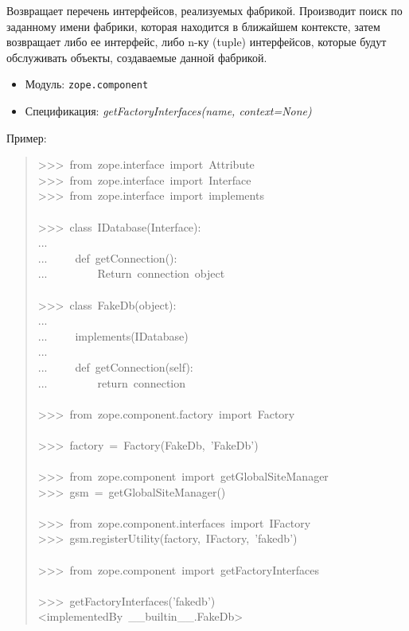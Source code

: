 \documentclass[a4paper,openany,twoside,final]{book}
\providecommand*{\DUroletitlereference}[1]{\textsl{#1}}
\begin{document}
Возвращает перечень интерфейсов, реализуемых фабрикой.  Производит
поиск по заданному имени фабрики, которая находится в ближайшем
контексте, затем возвращает либо ее интерфейс, либо n-ку (tuple)
интерфейсов, которые будут обслуживать объекты, создаваемые данной
фабрикой.

\begin{itemize}

\item Модуль: \texttt{zope.component}

\item Спецификация: \DUroletitlereference{getFactoryInterfaces(name, context=None)}

\end{itemize}

Пример:

\begin{quote}{\ttfamily \raggedright \noindent
>{}>{}>~from~zope.interface~import~Attribute\\
>{}>{}>~from~zope.interface~import~Interface\\
>{}>{}>~from~zope.interface~import~implements\\
~\\
>{}>{}>~class~IDatabase(Interface):\\
...\\
...~~~~~def~getConnection():\\
...~~~~~~~~~\textquotedbl{}\textquotedbl{}\textquotedbl{}Return~connection~object\textquotedbl{}\textquotedbl{}\textquotedbl{}\\
~\\
>{}>{}>~class~FakeDb(object):\\
...\\
...~~~~~implements(IDatabase)\\
...\\
...~~~~~def~getConnection(self):\\
...~~~~~~~~~return~\textquotedbl{}connection\textquotedbl{}\\
~\\
>{}>{}>~from~zope.component.factory~import~Factory\\
~\\
>{}>{}>~factory~=~Factory(FakeDb,~'FakeDb')\\
~\\
>{}>{}>~from~zope.component~import~getGlobalSiteManager\\
>{}>{}>~gsm~=~getGlobalSiteManager()\\
~\\
>{}>{}>~from~zope.component.interfaces~import~IFactory\\
>{}>{}>~gsm.registerUtility(factory,~IFactory,~'fakedb')\\
~\\
>{}>{}>~from~zope.component~import~getFactoryInterfaces\\
~\\
>{}>{}>~getFactoryInterfaces('fakedb')\\
<implementedBy~\_\_builtin\_\_.FakeDb>
}
\end{quote}
\end{document}
